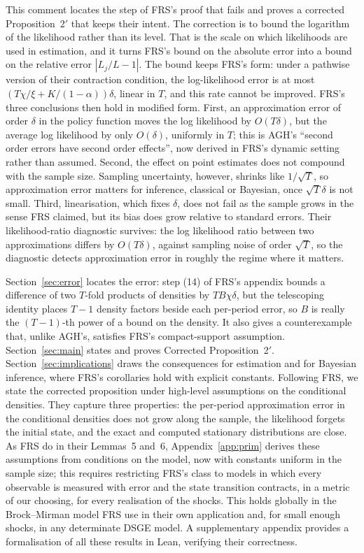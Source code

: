 \documentclass[11pt]{article}
\theoremstyle{definition}
\theoremstyle{remark}
\begin{document}
This comment locates the step of FRS's proof that fails and proves a corrected Proposition~2$'$ that keeps their intent. The correction is to bound the logarithm of the likelihood rather than its level. That is the scale on which likelihoods are used in estimation, and it turns FRS's bound on the absolute error into a bound on the relative error $|L_j/L - 1|$.
The bound keeps FRS's form: under a pathwise version of their contraction condition, the
log-likelihood error is at most $(T\chi/\xi + K/(1-\alpha))\delta$, linear in $T$, and this rate
cannot be improved. FRS's three conclusions then hold in modified form. First, an approximation
error of order $\delta$ in the policy function moves the log likelihood by $O(T\delta)$, but the
average log likelihood by only $O(\delta)$, uniformly in $T$; this is AGH's ``second order errors
have second order effects'', now derived in FRS's dynamic setting rather than assumed. Second, the
effect on point estimates does not compound with the sample size. Sampling uncertainty, however,
shrinks like $1/\sqrt{T}$, so approximation error matters for inference, classical or Bayesian,
once $\sqrt{T}\delta$ is not small. Third, linearisation, which fixes $\delta$, does not fail as
the sample grows in the sense FRS claimed, but its bias does grow relative to standard errors.
Their likelihood-ratio diagnostic survives: the log likelihood ratio between two approximations
differs by $O(T\delta)$, against sampling noise of order $\sqrt{T}$, so the diagnostic detects
approximation error in roughly the regime where it matters.

Section~\ref{sec:error} locates the error: step (14) of FRS's appendix bounds a difference of two
$T$-fold products of densities by $TB\chi\delta$, but the telescoping identity places $T-1$
density factors beside each per-period error, so $B$ is really the $(T-1)$-th power of a bound on
the density. It also gives a counterexample that, unlike AGH's, satisfies FRS's compact-support
assumption. Section~\ref{sec:main} states and proves Corrected Proposition~2$'$. Section~\ref{sec:implications}
draws the consequences for estimation and for Bayesian inference, where FRS's corollaries hold
with explicit constants. Following FRS, we state the corrected proposition under high-level
assumptions on the conditional densities. They capture three properties: the per-period
approximation error in the conditional densities does not grow along the sample, the likelihood
forgets the initial state, and the exact and computed stationary distributions are close. As FRS
do in their Lemmas~5 and~6, Appendix~\ref{app:prim} derives these assumptions from conditions on
the model, now with constants uniform in the sample size; this requires restricting FRS's class to
models in which every observable is measured with error and the state transition contracts, in a
metric of our choosing, for every realisation of the shocks. This holds globally in the
Brock--Mirman model FRS use in their own application and, for small enough shocks, in any
determinate DSGE model. A supplementary appendix provides a formalisation of all these results in Lean, verifying
their correctness.
\end{document}
